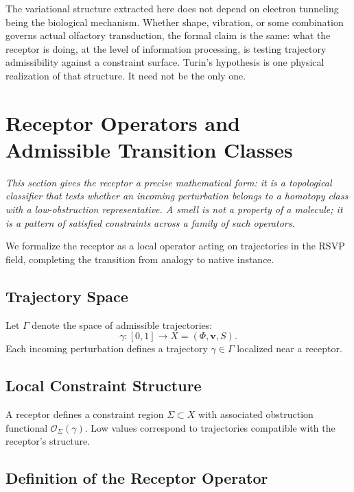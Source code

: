 \documentclass[12pt,a4paper]{article}
\begin{document}
The variational structure extracted here does not depend on electron tunneling being the biological mechanism. Whether shape, vibration, or some combination governs actual olfactory transduction, the formal claim is the same: what the receptor is doing, at the level of information processing, is testing trajectory admissibility against a constraint surface. Turin's hypothesis is one physical realization of that structure. It need not be the only one.

\section{Receptor Operators and Admissible Transition Classes}
\label{sec:receptor_operator}

\textit{This section gives the receptor a precise mathematical form: it is a topological classifier that tests whether an incoming perturbation belongs to a homotopy class with a low-obstruction representative. A smell is not a property of a molecule; it is a pattern of satisfied constraints across a family of such operators.}

We formalize the receptor as a local operator acting on trajectories in the RSVP field, completing the transition from analogy to native instance.

\subsection{Trajectory Space}

Let $\Gamma$ denote the space of admissible trajectories:
\[
\gamma : [0,1] \to X = (\Phi, \mathbf{v}, S).
\]
Each incoming perturbation defines a trajectory $\gamma \in \Gamma$ localized near a receptor.

\subsection{Local Constraint Structure}

A receptor defines a constraint region $\Sigma \subset X$ with associated obstruction functional $\mathcal{O}_\Sigma(\gamma)$. Low values correspond to trajectories compatible with the receptor's structure.

\subsection{Definition of the Receptor Operator}
\end{document}
